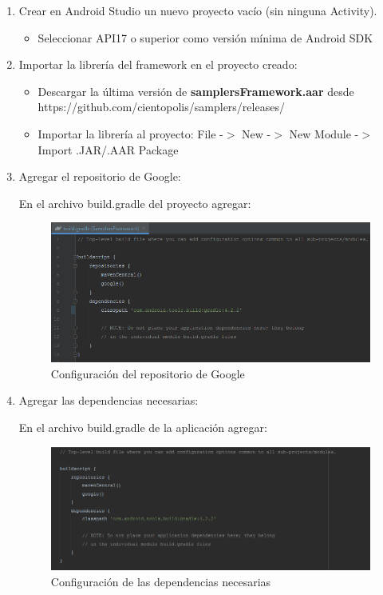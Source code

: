 \begin{enumerate}
	\item Crear en Android Studio un nuevo proyecto vacío (sin ninguna Activity).
		\begin{itemize}
		\item Seleccionar API17 o superior como versión mínima de Android SDK
		\end{itemize}
		
		
	\item Importar la librería del framework en el proyecto creado:
		\begin{itemize}
		\item Descargar la última versión de \textbf{samplersFramework.aar} desde https://github.com/cientopolis/samplers/releases/
		\item Importar la librería al proyecto: File -$>$ New -$>$ New Module -$>$ Import .JAR/.AAR Package
		\end{itemize}
		
\clearpage		
		
	\item Agregar el repositorio de Google:
	
		En el archivo build.gradle del proyecto agregar: 
			
\begin{figure}[H]
  \centering
    \includegraphics[scale=0.6]{50-anexos/A-instalacion/repositorio_google.png} 
   \caption{Configuración del repositorio de Google}
\end{figure}				
							
			

	\item Agregar las dependencias necesarias:
	
	En el archivo build.gradle de la aplicación agregar: 
	
\begin{figure}[H]
  \centering
    \includegraphics[scale=0.6]{50-anexos/A-instalacion/dependencias.png} 
   \caption{Configuración de las dependencias necesarias}
\end{figure}			
			



\end{enumerate}
